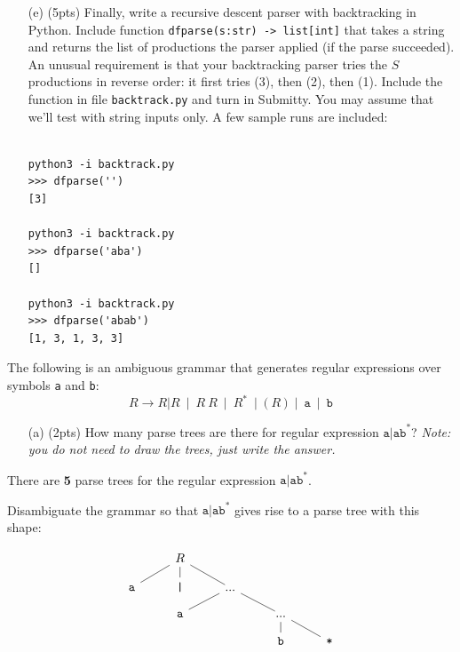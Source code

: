 \documentclass[11pt]{amsart}
\begin{document}
\begin{enumerate}
\item[(e)] (5pts) Finally, write a recursive descent parser with backtracking in Python. Include function \texttt{dfparse(s:str) -> list[int]} that takes a string and returns the list of productions the parser applied (if the parse succeeded). An unusual requirement is that your backtracking parser tries the $S$ productions in reverse order: it first tries (3), then (2), then (1). Include the function in file \texttt{backtrack.py} and turn in Submitty. You may assume that we'll test with string inputs only. A few sample runs are included:

\begin{verbatim}

python3 -i backtrack.py 
>>> dfparse('')
[3] 

python3 -i backtrack.py 
>>> dfparse('aba')
[]

python3 -i backtrack.py 
>>> dfparse('abab')
[1, 3, 1, 3, 3]

\end{verbatim}

\end{enumerate}

\vspace{.15in}

\newpage

The following is an ambiguous grammar that generates regular expressions over symbols \texttt{a} and \texttt{b}: 
\[R \rightarrow R \texttt{|} R \ \mid \ R \ R \ \mid \ R^\texttt{*} \ \mid \ \texttt{(} \ R \ \texttt{)}\ \mid \ \texttt{a}\ \mid\ \texttt{b} \]

\begin{enumerate}
\item [(a)] (2pts) How many parse trees are there for regular expression $\texttt{a|ab}^\texttt{*}$? {\it{Note: you do not need to draw the trees, just write the answer.}}
\end{enumerate}

\vspace{0.25cm}

There are \textbf{5} parse trees for the regular expression $\texttt{a|ab}^\texttt{*}$.

\vspace{0.25cm}

Disambiguate the grammar so that $\texttt{a|ab}^\texttt{*}$ gives rise to a parse tree with this shape:

\begin{equation*}
\begin{tikzcd} [row sep=small]
		& R \arrow[ld,no head] \arrow[rd,no head] \arrow[d,no head] &                           &                          &   \\
\texttt{a}	& \texttt{|}      & ... \arrow[ld,no head] \arrow[rd,no head] &                          &   \\
   		& \texttt{a}     &                           & ... \arrow[d,no head] \arrow[rd,no head]          &   \\
     		&                   &                           & \texttt{b}  &   \texttt{*} \\
\end{tikzcd}
\end{equation*}
\end{document}
